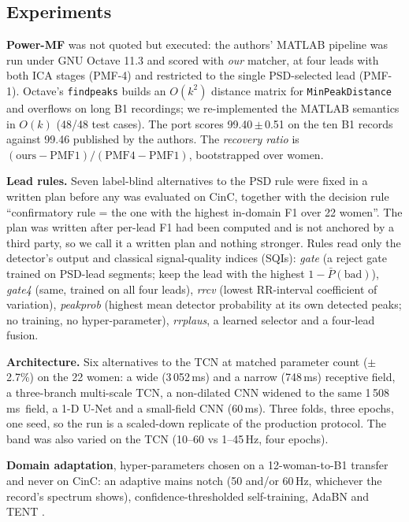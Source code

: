 \documentclass[10pt,twocolumn,a4paper]{article}
\newcommand{\ms}{\,ms}
\newcommand{\Hz}{\,Hz}
\begin{document}
\subsection{Experiments}
\textbf{Power-MF} \cite{jaeger2024} was not quoted but executed: the authors' MATLAB pipeline was run
under GNU Octave 11.3 and scored with \emph{our} matcher, at four leads with both ICA stages (PMF-4)
and restricted to the single PSD-selected lead (PMF-1). Octave's \texttt{findpeaks} builds an
$O(k^{2})$ distance matrix for \texttt{MinPeakDistance} and overflows on long B1 recordings; we
re-implemented the MATLAB semantics in $O(k)$ (48/48 test cases). The port scores 99.40\,$\pm$\,0.51 on the
ten B1 records against 99.46 published by the authors. The \emph{recovery ratio} is
$(\mathrm{ours}-\mathrm{PMF1})/(\mathrm{PMF4}-\mathrm{PMF1})$, bootstrapped over women.

\textbf{Lead rules.} Seven label-blind alternatives to the PSD rule were fixed in a written plan
before any was evaluated on CinC, together with the decision rule ``confirmatory rule = the one with the
highest in-domain F1 over 22 women''. The plan was written after per-lead F1 had been computed and is
not anchored by a third party, so we call it a written plan and nothing stronger. Rules read only
the detector's output and classical signal-quality indices (SQIs): \emph{gate} (a reject gate trained
on PSD-lead segments; keep the lead with the highest $1-\bar{P}(\mathrm{bad})$), \emph{gate4} (same,
trained on all four leads), \emph{rrcv} (lowest RR-interval coefficient of variation), \emph{peakprob}
(highest mean detector probability at its own detected peaks; no training, no hyper-parameter),
\emph{rrplaus}, a learned selector and a four-lead fusion.

\textbf{Architecture.} Six alternatives to the TCN at matched parameter count ($\pm$2.7\%) on the
22 women: a wide (3\,052\ms) and a narrow (748\ms) receptive field, a three-branch multi-scale TCN, a
non-dilated CNN widened to the same 1\,508\ms\ field, a 1-D U-Net and a small-field CNN (60\ms).
Three folds, three epochs, one seed, so the run is a scaled-down replicate of the production protocol.
The band was also varied on the TCN (10--60 vs 1--45\Hz, four epochs).

\textbf{Domain adaptation}, hyper-parameters chosen on a 12-woman-to-B1 transfer and never on CinC:
an adaptive mains notch (50 and/or 60\Hz, whichever the record's spectrum shows), confidence-thresholded
self-training, AdaBN \cite{li2018} and TENT \cite{wang2021}.
\end{document}
